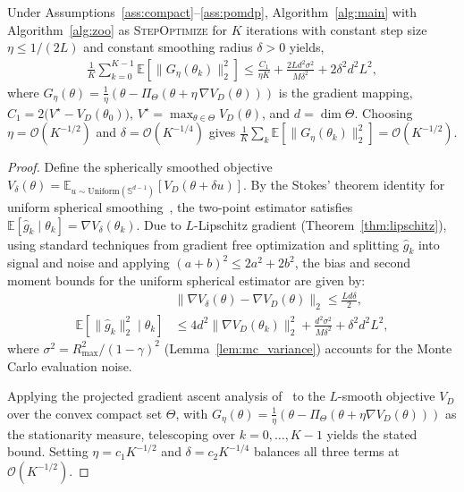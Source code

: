 \documentclass[12pt]{article}
\renewcommand{\[}{\left[}
\renewcommand{\]}{\right]}
\renewcommand{\(}{\left(}
\renewcommand{\)}{\right)}
\newcounter{l1}
\newcounter{l2}
\newcounter{l3}
\renewcommand{\hat}{\widehat}
\newcommand{\Rmax}{R_{\max}}
\begin{document}
\begin{theorem}
\label{thm:zoo_convergence}
Under Assumptions~\ref{ass:compact}--\ref{ass:pomdp}, Algorithm~\ref{alg:main} with Algorithm~\ref{alg:zoo} as \textsc{StepOptimize}
for $K$ iterations with constant step size $\eta \le 1/(2L)$ and constant smoothing
radius $\delta > 0$ yields,
\begin{align}
  \frac{1}{K}\sum_{k=0}^{K-1}\mathbb{E}\left[\|G_\eta(\theta_k)\|_2^2\right]
  \leq
  \frac{C_1}{\eta K}
  + \frac{2 L d^2\sigma^2}{M\delta^2}
  + 2\delta^2 d^2 L^2,
\end{align}
where $G_\eta(\theta) = \frac{1}{\eta}(\theta - \Pi_\Theta(\theta +
\eta\,\nabla V_D(\theta)))$ is the gradient mapping, $C_1 = 2\bigl(V^\star - V_D(\theta_0)\bigr)$, 
$V^\star = \max_{\theta\in\Theta} V_D(\theta)$, and $d = \dim\Theta$.
Choosing $\eta = \mathcal{O}(K^{-1/2})$ and $\delta = \mathcal{O}(K^{-1/4})$
gives $\frac{1}{K}\sum_k \mathbb{E}[\|G_\eta(\theta_k)\|_2^2] =
\mathcal{O}(K^{-1/2})$. 
\end{theorem}
\begin{proof}
Define the spherically smoothed objective
$V_\delta(\theta) = \mathbb{E}_{u \sim \mathrm{Uniform}(\mathbb{S}^{d-1})}[V_D(\theta + \delta u)]$.
By the Stokes' theorem identity for uniform spherical smoothing~\cite{flaxman2004online},
the two-point estimator satisfies
$\mathbb{E}[\hat{g}_k \mid \theta_k] = \nabla V_\delta(\theta_k)$.
Due to $L$-Lipschitz gradient (Theorem~\ref{thm:lipschitz}), using standard techniques from gradient free optimization
\cite{duchi2015optimal} and splitting $\hat{g}_k$ into signal
and noise and applying $(a+b)^2 \leq 2a^2 + 2b^2$, the bias and second
moment bounds for the uniform spherical estimator are given by:
\begin{align*}
  &\|\nabla V_\delta(\theta) - \nabla V_D(\theta)\|_2 \leq \frac{Ld\delta}{2},\\
  \mathbb{E}[\|\hat{g}_k\|_2^2 \mid \theta_k]
  &\leq 4d^2\|\nabla V_D(\theta_k)\|_2^2
    + \frac{d^2\sigma^2}{M\delta^2}
    + \delta^2 d^2 L^2,
\end{align*}
where $\sigma^2 = \Rmax^2/(1-\gamma)^2$ (Lemma~\ref{lem:mc_variance}) accounts
for the Monte Carlo evaluation noise.


Applying the projected gradient ascent analysis of~\cite{ghadimi2013stochastic}
to the $L$-smooth objective $V_D$ over the convex compact set $\Theta$, with
$G_\eta(\theta) = \frac{1}{\eta}(\theta - \Pi_\Theta(\theta + \eta\nabla V_D(\theta)))$
as the stationarity measure, telescoping over $k = 0,\dots,K-1$ yields the
stated bound. Setting $\eta = c_1 K^{-1/2}$ and $\delta = c_2 K^{-1/4}$ balances
all three terms at $\mathcal{O}(K^{-1/2})$.
\end{proof}
\end{document}
